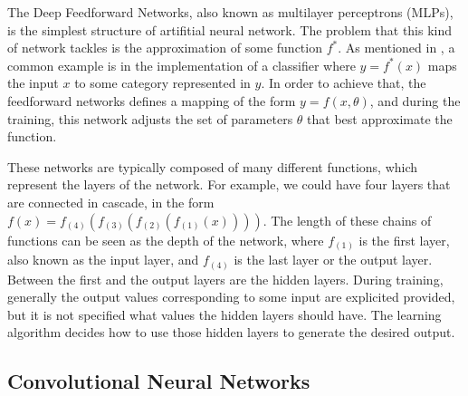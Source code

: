 The Deep Feedforward Networks, also known as multilayer perceptrons (MLPs), is the simplest structure  of artifitial neural network. The problem that this kind of network tackles is the approximation of some function \begin{math} f^{*}\end{math}. As mentioned in \cite{goodfellow_bengio_courville_2017}, a common example is in the implementation of a classifier where \begin{math} y = f^{*}(x)\end{math} maps the input \begin{math} x \end{math} to some category represented in \begin{math} y \end{math}. In order to achieve that, the feedforward networks defines a mapping of the form \begin{math} y = f(x, \theta)\end{math}, and during the training, this network adjusts the set of parameters \begin{math} \theta \end{math} that best approximate the function.

These networks are typically composed of many different functions, which represent the layers of the network. For example, we could have four layers that are connected in cascade, in the form \begin{math} f(x) = f_{(4)}(f_{(3)}(f_{(2)}(f_{(1)}(x)))) \end{math}. The length of these chains of functions can be seen as the depth of the network, where \begin{math} f_{(1)} \end{math} is the first layer, also known as the input layer, and \begin{math} f_{(4)} \end{math} is the last layer or the output layer. Between the first and the output layers are the hidden layers. During training, generally the output values corresponding to some input are explicited provided, but it is not specified what values the hidden layers should have. The learning algorithm decides how to use those hidden layers to generate the desired output.

\subsection{Convolutional Neural Networks}

